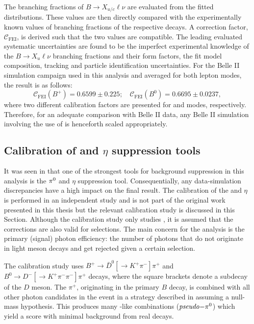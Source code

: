 The branching fractions of $B\rightarrow X_{u/c}\ell\nu$ are evaluated from the fitted distributions.
These values are then directly compared with the experimentally known values of branching fractions of the respective decays.
A correction factor, $\mathcal{C}_{\mathrm{FEI}}$, is derived such that the two values are compatible.
The leading evaluated systematic uncertainties are found to be the imperfect experimental knowledge of the $B\rightarrow X_u\ell\nu$ branching fractions and their form factors, the fit model composition, tracking and particle identification uncertainties.
For the Belle II simulation campaign used in this analysis and averaged for both lepton modes, the result is as follows:
\begin{equation}\label{eq:fei_calibration}
    \mathcal{C}_{\mathrm{FEI}}(B^+) = 0.6599 \pm 0.225; \quad \mathcal{C}_{\mathrm{FEI}}(B^0) = 0.6695 \pm 0.0237,
\end{equation}
where two different calibration factors are presented for \feiBp and \feiBz modes, respectively.
Therefore, for an adequate comparison with Belle II data, any Belle II simulation involving the use of \FEI is henceforth scaled appropriately.

\subsection{Calibration of \texorpdfstring{\piz}{pi0} and \texorpdfstring{$\eta$}{eta} suppression tools}\label{sec:piz_eta_calibration}
It was seen in  that one of the strongest tools for background suppression in this analysis is the $\pi^0$ and $\eta$ suppression tool.
Consequentially, any data-simulation discrepancies have a high impact on the final result.
The calibration of the \piz and $\eta$ is performed in an independent study and is not part of the original work presented in this thesis 
but the relevant calibration study is discussed in this Section.
Although the calibration study only studies \piVeto, it is assumed that the corrections are also valid for \etaVeto selections.
The main concern for the \BtoXsgamma analysis is the primary (signal) photon efficiency: the number of photons that do not originate in light meson decays and get rejected given a certain \piVeto selection.

The calibration study uses $B^+\to \bar{D}^0[\to K^+\pi^-]\pi^+$ and $B^0\to D^-[\to K^+\pi^-\pi^-]\pi^+$ decays, where the square brackets denote a subdecay of the $D$ meson.
The $\pi^+$, originating in the primary $B$ decay, is combined with all other photon candidates in the event in a strategy described in  assuming a null-mass hypothesis.
This produces many \piz-like combinations ($\mathit{pseudo}\mathrm{-}\pi^0$) which yield a \piVeto score with minimal background from real \piz decays.

